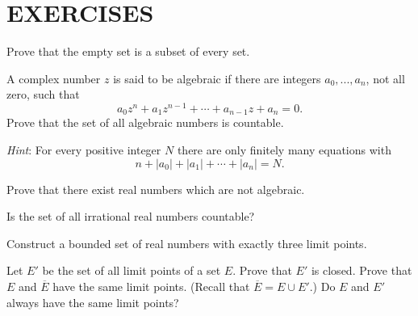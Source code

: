 
\section*{EXERCISES}

\begin{myExercise}
    \label{ex:2.1}
    Prove that the empty set is a subset of every set.
\end{myExercise}

\begin{myExercise}
    \label{ex:2.2}
    A complex number $z$ is said to be algebraic 
    if there are integers $a_0, ... , a_n$, not all
    zero, such that
    \begin{equation*}
        a_{0} z^{n} 
        + a_{1} z^{n-1}
        +\cdots
        + a_{n-1} z
        + a_n = 0 .
    \end{equation*}
    Prove that the set of all algebraic numbers is countable. 
    
    \emph{Hint}: For every positive integer $N$ 
    there are only finitely many equations with
    \begin{equation*}
        n 
        + |a_0|
        + |a_1|
        + \cdots
        + |a_n| = N .
    \end{equation*}
\end{myExercise}

\begin{myExercise}
    \label{ex:2.3}
    Prove that there exist real numbers which are not algebraic.
\end{myExercise}

\begin{myExercise}
    \label{ex:2.4}
    Is the set of all irrational real numbers countable?
\end{myExercise}

\begin{myExercise}
    \label{ex:2.5}
    Construct a bounded set of real numbers with exactly three limit points.
\end{myExercise}

\begin{myExercise}
    \label{ex:2.6}
    Let $E'$ be the set of all limit points of a set $E$. 
    Prove that $E'$ is closed. 
    Prove that $E$ and $\overline{E}$ have the same limit points. 
    (Recall that $\overline{E} = E \cup E'$.) 
    Do $E$ and $E'$ always have the same limit points?
\end{myExercise}

